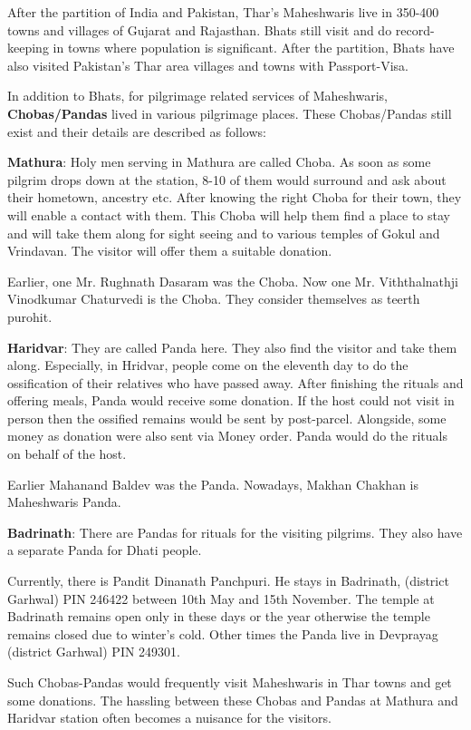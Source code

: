 After the partition of India and Pakistan, Thar's Maheshwaris live in 350-400
towns and villages of Gujarat and Rajasthan. Bhats still visit and do
record-keeping in towns where population is significant. After the partition,
Bhats have also visited Pakistan's Thar area villages and towns with
Passport-Visa. 

In addition to Bhats, for pilgrimage related services of Maheshwaris,
\textbf{Chobas/Pandas} lived in various pilgrimage places. These Chobas/Pandas
still exist and their details are described as follows:

\textbf{Mathura}: Holy men serving in Mathura are called Choba. As soon as some
pilgrim drops down at the station, 8-10 of them would surround and ask about
their hometown, ancestry etc. After knowing the right Choba for their town,
they will enable a contact with them. This Choba will help them find a place to
stay and will take them along for sight seeing and to various temples of Gokul
and Vrindavan. The visitor will offer them a suitable donation.

Earlier, one Mr. Rughnath Dasaram was the Choba. Now one Mr. Viththalnathji
Vinodkumar Chaturvedi is the Choba. They consider themselves as teerth purohit.

\textbf{Haridvar}: They are called Panda here. They also find the visitor and
take them along. Especially, in Hridvar, people come on the eleventh day to do
the ossification of their relatives who have passed away. After finishing the
rituals and offering meals, Panda would receive some donation. If the host
could not visit in person then the ossified remains would be sent by
post-parcel. Alongside, some money as donation were also sent via Money order.
Panda would do the rituals on behalf of the host.

Earlier Mahanand Baldev was the Panda. Nowadays, Makhan Chakhan is Maheshwaris
Panda.

\textbf{Badrinath}: There are Pandas for rituals for the visiting pilgrims.
They also have a separate Panda for Dhati people.

Currently, there is Pandit Dinanath Panchpuri. He stays in Badrinath, (district
Garhwal) PIN 246422 between 10th May and 15th November. The temple at Badrinath
remains open only in these days or the year otherwise the temple remains closed
due to winter's cold. Other times the Panda live in Devprayag (district
Garhwal) PIN 249301. 

Such Chobas-Pandas would frequently visit Maheshwaris in Thar towns and get
some donations. The hassling between these Chobas and Pandas at Mathura and
Haridvar station often becomes a nuisance for the visitors.

